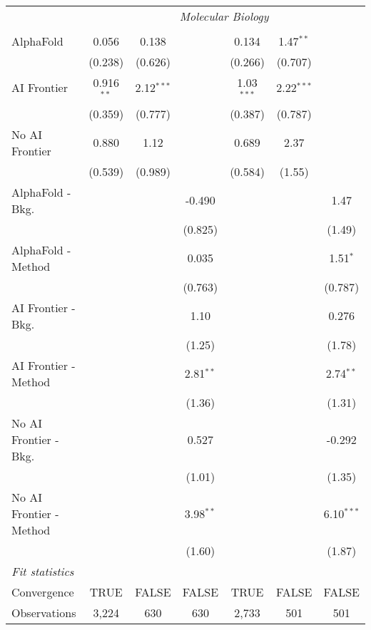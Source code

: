 \begin{tabular}{lcccccc}
 & \multicolumn{6}{c}{\textit{Molecular Biology}} \\ \\
   AlphaFold               & 0.056        & 0.138        &             & 0.134        & 1.47$^{**}$  &   \\   
                           & (0.238)      & (0.626)      &             & (0.266)      & (0.707)      &   \\   
   AI Frontier             & 0.916$^{**}$ & 2.12$^{***}$ &             & 1.03$^{***}$ & 2.22$^{***}$ &   \\   
                           & (0.359)      & (0.777)      &             & (0.387)      & (0.787)      &   \\   
   No AI Frontier          & 0.880        & 1.12         &             & 0.689        & 2.37         &   \\   
                           & (0.539)      & (0.989)      &             & (0.584)      & (1.55)       &   \\   
   AlphaFold - Bkg.        &              &              & -0.490      &              &              & 1.47\\   
                           &              &              & (0.825)     &              &              & (1.49)\\   
   AlphaFold - Method      &              &              & 0.035       &              &              & 1.51$^{*}$\\   
                           &              &              & (0.763)     &              &              & (0.787)\\   
   AI Frontier - Bkg.      &              &              & 1.10        &              &              & 0.276\\   
                           &              &              & (1.25)      &              &              & (1.78)\\   
   AI Frontier - Method    &              &              & 2.81$^{**}$ &              &              & 2.74$^{**}$\\   
                           &              &              & (1.36)      &              &              & (1.31)\\   
   No AI Frontier - Bkg.   &              &              & 0.527       &              &              & -0.292\\   
                           &              &              & (1.01)      &              &              & (1.35)\\   
   No AI Frontier - Method &              &              & 3.98$^{**}$ &              &              & 6.10$^{***}$\\   
                           &              &              & (1.60)      &              &              & (1.87)\\   
   \midrule
   \emph{Fit statistics}\\
   Convergence             &TRUE          & FALSE        & FALSE       & TRUE         & FALSE        & FALSE\\  
   Observations            & 3,224        & 630          & 630         & 2,733        & 501          & 501\\  
   

\end{tabular}
